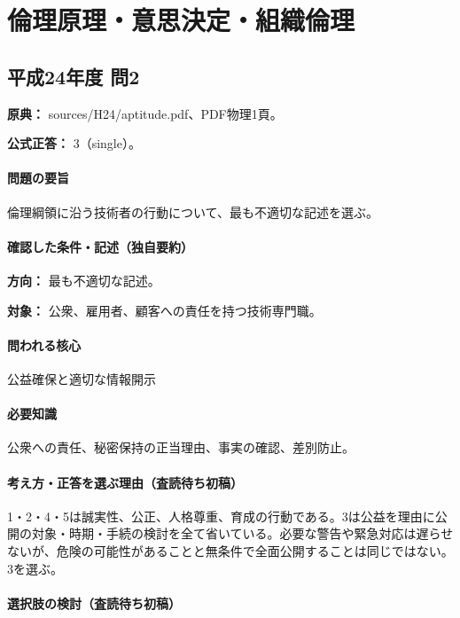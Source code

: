 \section{倫理原理・意思決定・組織倫理}

\subsection{平成24年度 問2}
\label{q:h24-reg-apt-02}

\noindent\textbf{原典：} sources/H24/aptitude.pdf、PDF物理1頁。

\textbf{公式正答：} 3（single）。

\paragraph{問題の要旨} 倫理綱領に沿う技術者の行動について、最も不適切な記述を選ぶ。

\paragraph{確認した条件・記述（独自要約）}\mbox{}\par

\noindent\textbf{方向：} 最も不適切な記述。\par

\noindent\textbf{対象：} 公衆、雇用者、顧客への責任を持つ技術専門職。\par

\paragraph{問われる核心} 公益確保と適切な情報開示

\paragraph{必要知識} 公衆への責任、秘密保持の正当理由、事実の確認、差別防止。

\paragraph{考え方・正答を選ぶ理由（査読待ち初稿）} 1・2・4・5は誠実性、公正、人格尊重、育成の行動である。3は公益を理由に公開の対象・時期・手続の検討を全て省いている。必要な警告や緊急対応は遅らせないが、危険の可能性があることと無条件で全面公開することは同じではない。3を選ぶ。

\paragraph{選択肢の検討（査読待ち初稿）}\mbox{}\par

